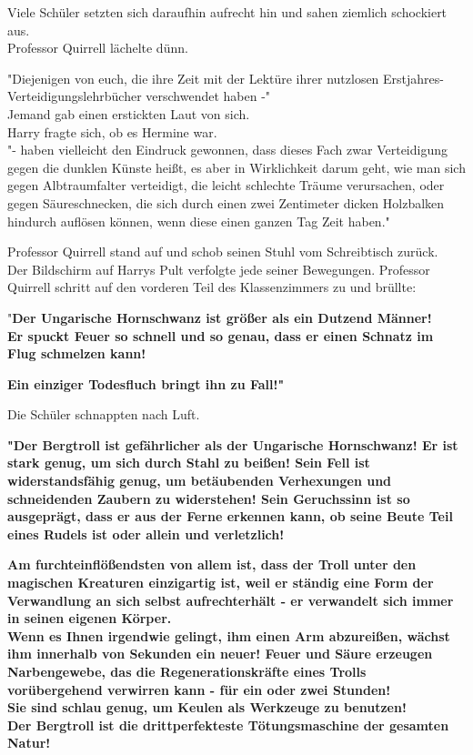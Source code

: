 {Viele Schüler setzten sich daraufhin aufrecht hin und sahen ziemlich schockiert aus.\\ Professor Quirrell lächelte dünn.

"Diejenigen von euch, die ihre Zeit mit der Lektüre ihrer nutzlosen Erstjahres-Verteidigungslehrbücher verschwendet haben -"\\ Jemand gab einen erstickten Laut von sich.\\ Harry fragte sich, ob es Hermine war.\\ "- haben vielleicht den Eindruck gewonnen, dass dieses Fach zwar Verteidigung gegen die dunklen Künste heißt, es aber in Wirklichkeit darum geht, wie man sich gegen Albtraumfalter verteidigt, die leicht schlechte Träume verursachen, oder gegen Säureschnecken, die sich durch einen zwei Zentimeter dicken Holzbalken hindurch auflösen können, wenn diese einen ganzen Tag Zeit haben."

Professor Quirrell stand auf und schob seinen Stuhl vom Schreibtisch zurück.\\ Der Bildschirm auf Harrys Pult verfolgte jede seiner Bewegungen. Professor Quirrell schritt auf den vorderen Teil des Klassenzimmers zu und brüllte:

"\textbf{Der Ungarische Hornschwanz ist größer als ein Dutzend Männer!}\\ \textbf{Er spuckt Feuer so schnell und so genau, dass er einen Schnatz im Flug schmelzen kann!}

\textbf{Ein einziger Todesfluch bringt ihn zu Fall!"}

Die Schüler schnappten nach Luft.

\textbf{"Der Bergtroll ist gefährlicher als der Ungarische Hornschwanz! Er ist stark genug, um sich durch Stahl zu beißen! Sein Fell ist widerstandsfähig genug, um betäubenden Verhexungen und schneidenden Zaubern zu widerstehen! Sein Geruchssinn ist so ausgeprägt, dass er aus der Ferne erkennen kann, ob seine Beute Teil eines Rudels ist oder allein und verletzlich!}

\textbf{Am furchteinflößendsten von allem ist, dass der Troll unter den magischen Kreaturen einzigartig ist, weil er ständig eine Form der Verwandlung an sich selbst aufrechterhält - er verwandelt sich immer in seinen eigenen Körper.}\\ \textbf{\hfill\break Wenn es Ihnen irgendwie gelingt, ihm einen Arm abzureißen, wächst ihm innerhalb von Sekunden ein neuer! Feuer und Säure erzeugen Narbengewebe, das die Regenerationskräfte eines Trolls vorübergehend verwirren kann - für ein oder zwei Stunden!\\ Sie sind schlau genug, um Keulen als Werkzeuge zu benutzen!}\\ \textbf{Der Bergtroll ist die drittperfekteste Tötungsmaschine der gesamten Natur!}\\

}
